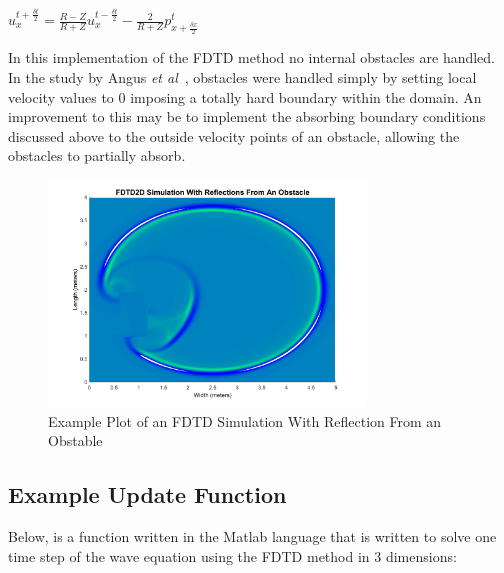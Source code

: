 \begin{center}
$ u^{t + \frac{\delta t}{2}}_{x} = \frac{R - Z}{R + Z} u^{t - \frac{\delta t}{2}}_{x} - \frac{2}{R + Z} p^{t}_{x+ \frac{\delta x}{2}} $\\
\end{center}
In this implementation of the FDTD method no internal obstacles are handled. In the study by Angus \textit{et al}~\cite{Angus2010}, obstacles were handled simply by setting local velocity  values to 0 imposing a totally hard boundary within the domain. An improvement to this may be to implement the absorbing boundary conditions discussed above to the outside velocity points of an obstacle, allowing the obstacles to partially absorb.
\begin{figure}[H]
\centering
  \includegraphics[width=0.75\textwidth]{./graphics/fdtd2dReflectingObstacle.png}
  \caption{Example Plot of an FDTD Simulation With Reflection From an Obstable}
\end{figure}

\subsection{Example Update Function}
Below, is a function written in the Matlab language that is written to solve one time step of the wave equation using the FDTD method in 3 dimensions:



